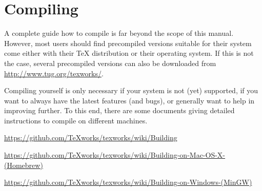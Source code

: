 
\chapter{Compiling {\Tw}}
\label{sec.compiling}

A complete guide how to compile {\Tw} is far beyond the scope of this manual. However, most users should find precompiled versions suitable for their system come either with their {\TeX} distribution or their operating system. If this is not the case, several precompiled versions can also be downloaded from \url{http://www.tug.org/texworks/}.

Compiling {\Tw} yourself is only necessary if your system is not (yet) supported, if you want to always have the latest features (and bugs), or generally want to help in improving {\Tw} further. To this end, there are some documents giving detailed instructions to compile {\Tw} on different machines.

\begin{OSLinux}
\noindent\url{https://github.com/TeXworks/texworks/wiki/Building} \\
\end{OSLinux}

\begin{OSMac}
\noindent\raggedright\url{https://github.com/TeXworks/texworks/wiki/Building-on-Mac-OS-X-(Homebrew)} \\
\end{OSMac}

\begin{OSWindows}
\noindent\raggedright\url{https://github.com/TeXworks/texworks/wiki/Building-on-Windows-(MinGW)} \\
\end{OSWindows}
